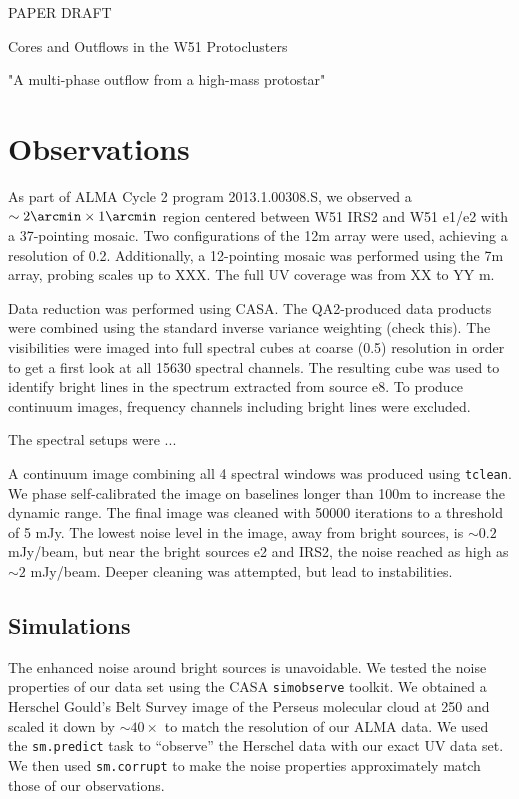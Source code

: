PAPER DRAFT

Cores and Outflows in the W51 Protoclusters



"A multi-phase outflow from a high-mass protostar"


\section{Observations}
As part of ALMA Cycle 2 program 2013.1.00308.S, we observed a
$\sim2\arcmin\times1\arcmin$ region centered between W51 IRS2 and W51 e1/e2
with a 37-pointing mosaic.  Two configurations of the 12m array were used,
achieving a resolution of 0.2\arcsec.  Additionally, a 12-pointing mosaic was
performed using the 7m array, probing scales up to XXX\arcsec.  The full UV
coverage was from XX to YY m.

Data reduction was performed using CASA.  The QA2-produced data products were
combined using the standard inverse variance weighting (check this).
The visibilities were imaged into full spectral cubes at coarse (0.5\arcsec)
resolution in order to get a first look at all 15630 spectral channels.  The
resulting cube was used to identify bright lines in the spectrum extracted
from source e8.  To produce continuum images, frequency channels including
bright lines were excluded.

The spectral setups were ...

A continuum image combining all 4 spectral windows was produced using
\texttt{tclean}.  We phase self-calibrated the image on baselines longer than
100m to increase the dynamic range.  The final image was cleaned with 50000
iterations to a threshold of 5 mJy.  The lowest noise level in the image, away
from bright sources, is $\sim0.2$ mJy/beam, but near the bright sources e2 and
IRS2, the noise reached as high as $\sim2$ mJy/beam.  Deeper cleaning was
attempted, but lead to instabilities.

\subsection{Simulations}
The enhanced noise around bright sources is unavoidable.  We tested the noise
properties of our data set using the CASA \texttt{simobserve} toolkit.  We
obtained a Herschel Gould's Belt Survey image of the Perseus molecular cloud at
250 \um \citep[resolution 18\arcsec][]{} and scaled it down by $\sim40\times$
to match the resolution of our ALMA data.  We used the \texttt{sm.predict} task
to ``observe'' the Herschel data with our exact UV data set.  We then used
\texttt{sm.corrupt} to make the noise properties approximately match those of
our observations.

